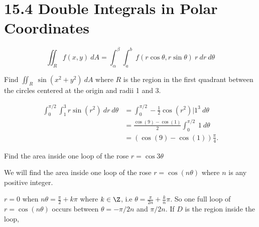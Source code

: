\documentclass[12pt]{exam}
\newcommand{\qdate}{15.4 Double Integrals in Polar Coordinates} %
\begin{document}
\section*{\qdate}


\begin{info}
    \[
        \displaystyle\iint_R f(x,y)~dA = \int_\alpha^{\beta}\int_{a}^{b}~f(r\cos\theta,r\sin\theta)~r~dr~d\theta 
    \]
\end{info}

\begin{questions}

\question Find \(\iint_R~\sin(x^2+y^2)~dA\) where \(R\) is the region in the first quadrant between the circles centered at the origin and radii 1 and 3.
\ifprintanswers
        \begin{solution}
            \begin{align*}
            \int_0^{\pi/2}\int_1^3 r\sin(r^2)~dr~d\theta & = \int_0^{\pi/2}-\frac{1}{2}\cos(r^2)|1^3~d\theta\\
                &= \frac{\cos(9)-\cos(1)}{2} \int_0^{\pi/2}~1~d\theta\\
                &= \left(\cos(9)-\cos(1)\right)\frac{\pi}{4}.
            \end{align*}
        \end{solution}
    \else
        \vfill
    \fi

\question Find the area inside one loop of the rose \(r=\cos3\theta\)
\ifprintanswers
        \begin{solution}
            We will find the area inside one loop of the rose \(r=\cos(n\theta)\) where \(n\) is any positive integer.

            \(r=0\) when \(n\theta=\frac{\pi}{2}+k\pi\) where \(k\in \Z\), i.e \(\theta=\frac{\pi}{2n}+\frac{k}{n}\pi\). 
            So one full loop of \(r=\cos(n\theta)\) occurs between \(\theta=-\pi/2n\) and \(\pi/2n\). If \(D\) is the region inside the loop,


\end{solution}
\end{questions}
\end{document}
